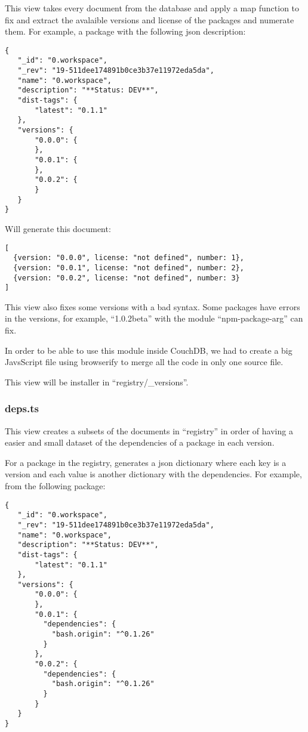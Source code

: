 \documentclass[letterpaper,12pt]{report}
\begin{document}
This view takes every document from the database and apply a map function to fix
and extract the avalaible versions and license of the packages and numerate
them. For example, a package with the following json description:

\begin{verbatim}
{
   "_id": "0.workspace",
   "_rev": "19-511dee174891b0ce3b37e11972eda5da",
   "name": "0.workspace",
   "description": "**Status: DEV**",
   "dist-tags": {
       "latest": "0.1.1"
   },
   "versions": {
       "0.0.0": {
       },
       "0.0.1": {
       },
       "0.0.2": {
       }
   }
}
\end{verbatim}

Will generate this document:

\begin{verbatim}
[
  {version: "0.0.0", license: "not defined", number: 1},
  {version: "0.0.1", license: "not defined", number: 2}, 
  {version: "0.0.2", license: "not defined", number: 3}
]
\end{verbatim}

This view also fixes some versions with a bad syntax. Some packages have errors
in the versions, for example, ``1.0.2beta'' with the module ``npm-package-arg''
can fix.

In order to be able to use this module inside CouchDB, we had to create a big
JavsScript file using browserify to merge all the code in only one source file.

This view will be installer in ``registry/\_versions''.

\subsubsection{deps.ts}

This view creates a subsets of the documents in ``registry'' in order of having
a easier and small dataset of the dependencies of a package in each version.

For a package in the registry, generates a json dictionary where each key is a
version and each value is another dictionary with the dependencies. For example,
from the following package:

\begin{verbatim}
{
   "_id": "0.workspace",
   "_rev": "19-511dee174891b0ce3b37e11972eda5da",
   "name": "0.workspace",
   "description": "**Status: DEV**",
   "dist-tags": {
       "latest": "0.1.1"
   },
   "versions": {
       "0.0.0": {
       },
       "0.0.1": {
         "dependencies": {
           "bash.origin": "^0.1.26"
         }
       },
       "0.0.2": {
         "dependencies": {
           "bash.origin": "^0.1.26"
         }
       }
   }
}
\end{verbatim}
\end{document}
